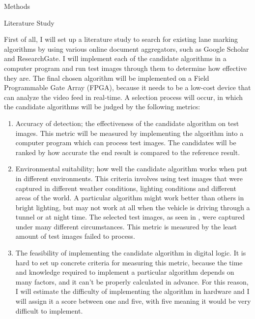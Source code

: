 \documentclass{matthijs}
\begin{document}
	\begin{hoofdstuk}{Methods}

		\begin{paragraaf}{Literature Study}

		First of all, I will set up a literature study to search for existing lane marking algorithms by using various online document aggregators, such as Google Scholar and ResearchGate.
		I will implement each of the candidate algorithms in a computer program and run test images through them to determine how effective they are.
		The final chosen algorithm will be implemented on a Field Programmable Gate Array (FPGA), because it needs to be a low-cost device that can analyze the video feed in real-time.
		A selection process will occur, in which the candidate algorithms will be judged by the following metrics:

		\begin{enumerate}

			\item	Accuracy of detection; the effectiveness of the candidate algorithm on test images.
				This metric will be measured by implementing the algorithm into a computer program which can process test images.
				The candidates will be ranked by how accurate the end result is compared to the reference result.

			\item	Environmental suitability; how well the candidate algorithm works when put in different environments.
				This criteria involves using test images that were captured in different weather conditions, lighting conditions and different areas of the world.
				A particular algorithm might work better than others in bright lighting, but may not work at all when the vehicle is driving through a tunnel or at night time.
				The selected test images, as seen in , were captured under many different circumstances.
				This metric is measured by the least amount of test images failed to process.

			\item	The feasibility of implementing the candidate algorithm in digital logic.
				It is hard to set up concrete criteria for measuring this metric, because the time and knowledge required to implement a particular algorithm depends on many factors, and it can't be properly calculated in advance.
				For this reason, I will estimate the difficulty of implementing the algorithm in hardware and I will assign it a score between one and five, with five meaning it would be very difficult to implement.


\end{enumerate}
\end{paragraaf}
\end{hoofdstuk}
\end{document}
